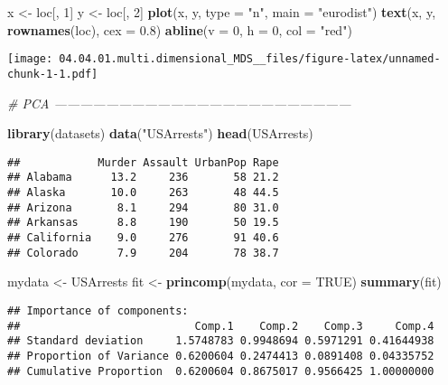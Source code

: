 \documentclass[]{article}
\newenvironment{Shaded}{\begin{snugshade}}{\end{snugshade}}
\newcommand{\KeywordTok}[1]{\textcolor[rgb]{0.13,0.29,0.53}{\textbf{#1}}}
\newcommand{\DataTypeTok}[1]{\textcolor[rgb]{0.13,0.29,0.53}{#1}}
\newcommand{\DecValTok}[1]{\textcolor[rgb]{0.00,0.00,0.81}{#1}}
\newcommand{\FloatTok}[1]{\textcolor[rgb]{0.00,0.00,0.81}{#1}}
\newcommand{\StringTok}[1]{\textcolor[rgb]{0.31,0.60,0.02}{#1}}
\newcommand{\CommentTok}[1]{\textcolor[rgb]{0.56,0.35,0.01}{\textit{#1}}}
\newcommand{\OtherTok}[1]{\textcolor[rgb]{0.56,0.35,0.01}{#1}}
\newcommand{\NormalTok}[1]{#1}
\begin{document}
\begin{Shaded}
\begin{Highlighting}[]
\NormalTok{x <-}\StringTok{ }\NormalTok{loc[, }\DecValTok{1}\NormalTok{]}
\NormalTok{y <-}\StringTok{ }\NormalTok{loc[, }\DecValTok{2}\NormalTok{]}
\KeywordTok{plot}\NormalTok{(x, y, }\DataTypeTok{type =} \StringTok{"n"}\NormalTok{, }\DataTypeTok{main =} \StringTok{"eurodist"}\NormalTok{)}
\KeywordTok{text}\NormalTok{(x, y, }\KeywordTok{rownames}\NormalTok{(loc), }\DataTypeTok{cex =} \FloatTok{0.8}\NormalTok{)}
\KeywordTok{abline}\NormalTok{(}\DataTypeTok{v =} \DecValTok{0}\NormalTok{, }\DataTypeTok{h =} \DecValTok{0}\NormalTok{, }\DataTypeTok{col =} \StringTok{"red"}\NormalTok{)}
\end{Highlighting}
\end{Shaded}

\texttt{[image: 04.04.01.multi.dimensional\_MDS\_\_files/figure-latex/unnamed-chunk-1-1.pdf]}

\begin{Shaded}
\begin{Highlighting}[]
\CommentTok{# PCA ---------------------------------------------------------------------}


\KeywordTok{library}\NormalTok{(datasets)}
\KeywordTok{data}\NormalTok{(}\StringTok{"USArrests"}\NormalTok{)}
\KeywordTok{head}\NormalTok{(USArrests)}
\end{Highlighting}
\end{Shaded}

\begin{verbatim}
##            Murder Assault UrbanPop Rape
## Alabama      13.2     236       58 21.2
## Alaska       10.0     263       48 44.5
## Arizona       8.1     294       80 31.0
## Arkansas      8.8     190       50 19.5
## California    9.0     276       91 40.6
## Colorado      7.9     204       78 38.7
\end{verbatim}

\begin{Shaded}
\begin{Highlighting}[]
\NormalTok{mydata <-}\StringTok{ }\NormalTok{USArrests}
\NormalTok{fit <-}\StringTok{ }\KeywordTok{princomp}\NormalTok{(mydata, }\DataTypeTok{cor =} \OtherTok{TRUE}\NormalTok{)}
\KeywordTok{summary}\NormalTok{(fit)}
\end{Highlighting}
\end{Shaded}

\begin{verbatim}
## Importance of components:
##                           Comp.1    Comp.2    Comp.3     Comp.4
## Standard deviation     1.5748783 0.9948694 0.5971291 0.41644938
## Proportion of Variance 0.6200604 0.2474413 0.0891408 0.04335752
## Cumulative Proportion  0.6200604 0.8675017 0.9566425 1.00000000
\end{verbatim}
\end{document}
